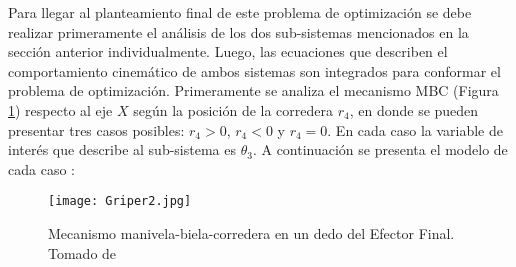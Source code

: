 Para llegar al planteamiento final de este problema de optimización se debe realizar primeramente el análisis de los dos sub-sistemas mencionados en la sección anterior individualmente. Luego, las ecuaciones que describen el comportamiento cinemático de ambos sistemas son integrados para conformar el problema de optimización. Primeramente se analiza el mecanismo MBC (Figura \ref{fig:Griper_MBC}) respecto al eje $X$ según la posición de la corredera $r_4$, en donde se pueden presentar tres casos posibles: $r_4 > 0$, $r_4 < 0$ y $r_4 = 0$. En cada caso la variable de interés que describe al sub-sistema es $\theta_3$. A continuación se presenta el modelo de cada caso \cite{capistran_2015}:
\begin{figure}[htb]
    \centering
     \texttt{[image: Griper2.jpg]}
    \caption[Mecanismo manivela-biela-corredera en un dedo del Efector Final.]{Mecanismo manivela-biela-corredera en un dedo del Efector Final. Tomado de \cite{zapata_zapata_control_2017} }
    \label{fig:Griper_MBC}
\end{figure}
